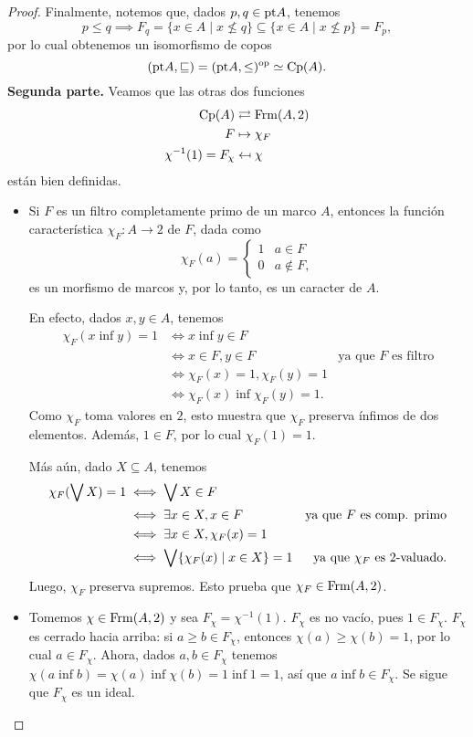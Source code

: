 \begin{proof}
    Finalmente, notemos que, dados $p,q\in\mathrm{pt} A$, tenemos
    \[
        p\leq q
        \implies
        F_q=\{x\in A\mid x\nleq q\}
        \subseteq
        \{x\in A\mid x\nleq p\}=F_p,
    \]
    por lo cual obtenemos un isomorfismo de copos
    \[
        (\mathrm{pt} A,\sqsubseteq)=(\mathrm{pt} A,\leq)^{\mathrm{op}} \simeq \mathrm{Cp}(A)
    .\]
    \textbf{Segunda parte.}
    Veamos que las otras dos funciones
    \begin{align*}
        \mathrm{Cp}(A) &\rightleftarrows \mathrm{Frm}(A,2) \\
        F &\mapsto \chi_F \\
        \chi^{-1}(1) = F_\chi &\mapsfrom \chi
    \end{align*}
    están bien definidas.
    \begin{itemize}
        \item
        Si $F$ es un filtro completamente primo de un marco $A$, entonces
        la función característica $\chi_F:A\to 2$ de $F$, dada como
        \[
            \chi_F(a)=
            \begin{cases}
                1 & a\in F \\
                0 & a\nin F,
            \end{cases}
        \]
        es un morfismo de marcos y, por lo tanto, es un caracter de $A$.
        
        En efecto, dados $x,y\in A$, tenemos
        \begin{align*}
            \chi_F(x\inf y) = 1
            &\iff x\inf y\in F \\
            &\iff x\in F, y\in F & \text{ya que $F$ es filtro} \\
            &\iff \chi_F(x)=1, \chi_F(y)=1 \\
            &\iff \chi_F(x)\inf\chi_F(y)=1.
        \end{align*}
        Como $\chi_F$ toma valores en $2$, esto muestra que
        $\chi_F$ preserva ínfimos de dos elementos.
        Además, $1\in F$, por lo cual $\chi_F(1)=1$.
        
        Más aún, dado $X\subseteq A$, tenemos
        \begin{align*}
            \chi_F(\bigvee X) = 1
            &\iff \bigvee X\in F \\
            &\iff \exists x\in X, x\in F
                & \text{ya que $F$ es comp. primo} \\
            &\iff \exists x\in X, \chi_F(x) = 1 \\
            &\iff \bigvee\{\chi_F(x)\mid x\in X\} = 1
                & \text{ya que $\chi_F$ es $2$-valuado.}
        \end{align*}
        Luego, $\chi_F$ preserva supremos.
        Esto prueba que $\chi_F\in\mathrm{Frm}(A,2)$.
        \item
        Tomemos $\chi\in\mathrm{Frm}(A,2)$ y sea $F_\chi=\chi^{-1}(1)$.
        $F_\chi$ es no vacío, pues $1\in F_\chi$.
        $F_\chi$ es cerrado hacia arriba: si $a\geq b\in F_\chi$,
        entonces $\chi(a)\geq\chi(b)=1$, por lo cual $a\in F_\chi$.
        Ahora, dados $a,b\in F_\chi$ tenemos
        $\chi(a\inf b)=\chi(a)\inf\chi(b)=1\inf 1=1$, así que
        $a\inf b\in F_\chi$.
        Se sigue que $F_\chi$ es un ideal.
        

\end{itemize}
\end{proof}
